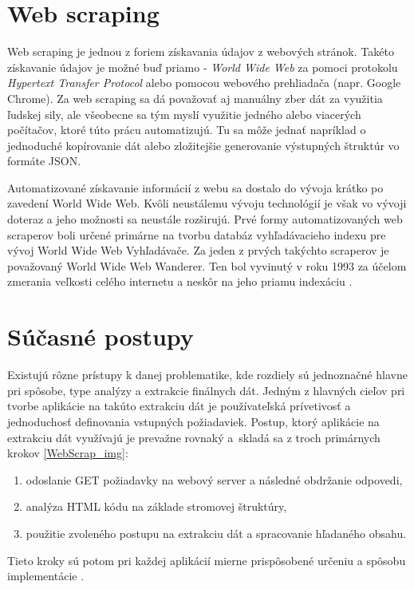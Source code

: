 \section{Web scraping}

Web scraping je jednou z foriem získavania údajov z webových stránok. Takéto získavanie údajov je možné buď priamo - \textit{World Wide Web} za pomoci protokolu \textit{Hypertext Transfer Protocol} alebo pomocou webového prehliadača (napr. Google Chrome). Za web scraping sa dá považovať aj manuálny zber dát za využitia ľudskej sily, ale všeobecne sa tým myslí využitie jedného alebo viacerých počítačov, ktoré túto prácu automatizujú. Tu sa môže jednať napríklad o jednoduché kopírovanie dát alebo zložitejšie generovanie výstupných štruktúr vo formáte JSON.

Automatizované získavanie informácií z webu sa dostalo do vývoja krátko po zavedení World Wide Web. Kvôli neustálemu vývoju technológií je však vo vývoji doteraz a jeho možnosti sa neustále rozširujú. Prvé formy automatizovaných web scraperov boli určené primárne na tvorbu databáz vyhľadávacieho indexu pre vývoj World Wide Web Vyhľadávače. Za jeden z prvých takýchto scraperov je považovaný World Wide Web Wanderer. Ten bol vyvinutý v roku 1993 za účelom zmerania veľkosti celého internetu a neskôr na jeho priamu indexáciu \cite{online:how_does_scraping_work}. 

\section{Súčasné postupy}

Existujú rôzne prístupy k danej problematike, kde rozdiely sú jednoznačné hlavne pri spôsobe, type analýzy a extrakcie finálnych dát. Jedným z hlavných cieľov pri tvorbe aplikácie na takúto extrakciu dát je používateľská prívetivosť a jednoduchosť definovania vstupných požiadaviek. Postup, ktorý aplikácie na extrakciu dát využívajú je prevažne rovnaký a~skladá sa z troch primárnych krokov \ref{WebScrap_img}:
\begin{enumerate}
  \item odoslanie GET požiadavky na webový server a následné obdržanie odpovedi,
  \item analýza HTML kódu na základe stromovej štruktúry,
  \item použitie zvoleného postupu na extrakciu dát a spracovanie hľadaného obsahu.
\end{enumerate}

Tieto kroky sú potom pri každej aplikácií mierne prispôsobené určeniu a spôsobu implementácie \cite{online:how_does_scraping_work}. 

